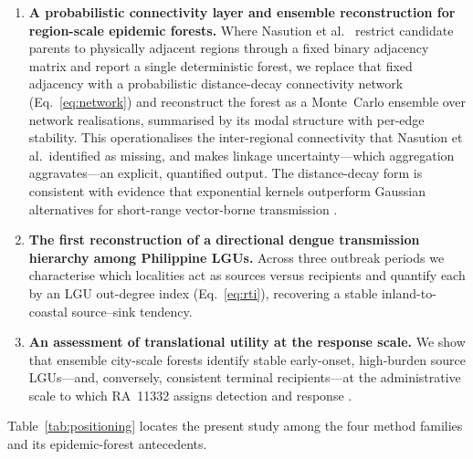 \documentclass[a4paper,11pt]{article}
\begin{document}
\begin{enumerate}
    \item \textbf{A probabilistic connectivity layer and ensemble reconstruction
    for region-scale epidemic forests.} Where Nasution et al.\
    \cite{Nasution2024} restrict candidate parents to physically adjacent regions
    through a fixed binary adjacency matrix and report a single deterministic
    forest, we replace that fixed adjacency with a probabilistic distance-decay
    connectivity network (Eq.~\ref{eq:network}) and reconstruct the forest as a
    Monte~Carlo ensemble over network realisations, summarised by its modal
    structure with per-edge stability. This operationalises the inter-regional
    connectivity that Nasution et al.\ identified as missing, and makes linkage
    uncertainty---which aggregation aggravates---an explicit, quantified output.
    The distance-decay form is consistent with evidence that exponential kernels
    outperform Gaussian alternatives for short-range vector-borne transmission
    \cite{Ng2019,Routledge2021}.

    \item \textbf{The first reconstruction of a directional dengue transmission
    hierarchy among Philippine LGUs.} Across three outbreak periods we
    characterise which localities act as sources versus recipients and quantify
    each by an LGU out-degree index (Eq.~\ref{eq:rti}), recovering a stable
    inland-to-coastal source--sink tendency.

    \item \textbf{An assessment of translational utility at the response scale.}
    We show that ensemble city-scale forests identify stable early-onset,
    high-burden source LGUs---and, conversely, consistent terminal
    recipients---at the administrative scale to which RA~11332 assigns detection
    and response \cite{Nunes2014,Stoddard2013}.
\end{enumerate}

Table~\ref{tab:positioning} locates the present study among the four method
families and its epidemic-forest antecedents.
\end{document}
